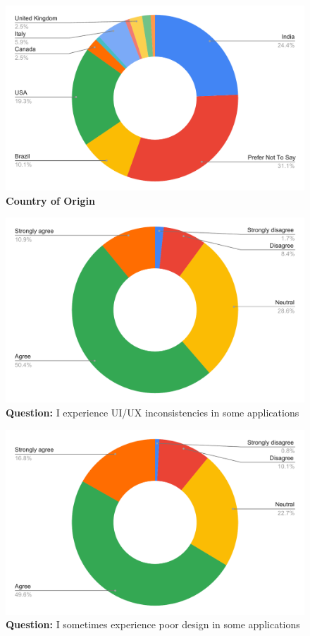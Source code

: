 \begin{figure}[H]
  \centering
  \includegraphics[width=13cm]{thesis/paper/images/p1_country.pdf}
  \textbf{Country of Origin}
\end{figure}

\begin{figure}[H]
  \centering
  \includegraphics[width=13cm]{thesis/paper/images/p1_q1.pdf}
  \textbf{Question:} I experience UI/UX inconsistencies in some applications
\end{figure}

\begin{figure}[H]
  \centering
  \includegraphics[width=13cm]{thesis/paper/images/p1_q2.pdf}
  \textbf{Question:} I sometimes experience poor design in some applications
\end{figure}


